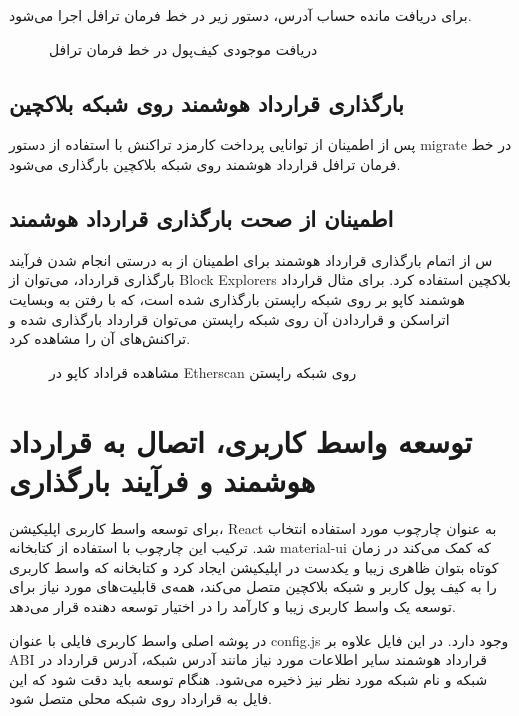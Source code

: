 برای دریافت مانده حساب آدرس، دستور زیر در خط فرمان ترافل اجرا می‌شود.

\begin{figure}[ht]
\centerline{}
\caption{دریافت موجودی کیف‌پول در خط فرمان ترافل}
\label{fig:get-wallet-balance}
\end{figure}


\subsection{بارگذاری قرارداد هوشمند روی شبکه بلاکچین}
پس از اطمینان از توانایی پرداخت کارمزد تراکنش با استفاده از دستور migrate در خط فرمان ترافل قرارداد هوشمند روی شبکه بلاکچین بارگذاری می‌شود.


\subsection{اطمینان از صحت بارگذاری قرارداد هوشمند}
س از اتمام بارگذاری قرارداد هوشمند برای اطمینان از به درستی انجام شدن فرآیند بارگذاری قرارداد، می‌توان از
\glspl{Block Explorer}
بلاکچین استفاده کرد. برای مثال قرارداد هوشمند کاپو بر روی شبکه راپستن بارگذاری شده است، که با رفتن به وبسایت اتراسکن
و قراردادن آن روی شبکه راپستن می‌توان قرارداد بارگذاری شده و تراکنش‌های آن را مشاهده کرد.


\begin{figure}[ht]
\centerline{}
\caption{مشاهده قراداد کاپو در Etherscan روی شبکه راپستن}
\label{fig:etherscan}
\end{figure}


\section{توسعه واسط کاربری، اتصال به قرارداد هوشمند و فرآیند بارگذاری}
برای توسعه واسط کاربری اپلیکیشن، React به عنوان چارچوب مورد استفاده انتخاب شد. ترکیب این چارچوب با استفاده از کتابخانه material-ui که کمک می‌کند در زمان کوتاه بتوان ظاهری زیبا و یکدست در اپلیکیشن ایجاد کرد و کتابخانه
که واسط کاربری را به کیف پول کاربر و شبکه بلاکچین متصل می‌کند، همه‌ی قابلیت‌های مورد نیاز برای توسعه یک واسط کاربری زیبا و کارآمد را در اختیار توسعه دهنده قرار می‌دهد.

در پوشه اصلی واسط کاربری فایلی با عنوان config.js وجود دارد. در این فایل علاوه بر ABI قرارداد هوشمند سایر اطلاعات مورد نیاز مانند آدرس شبکه، آدرس قرارداد در شبکه و نام شبکه مورد نظر نیز ذخیره می‌شود. هنگام توسعه باید دقت شود که این فایل به قرارداد روی شبکه محلی متصل شود.

